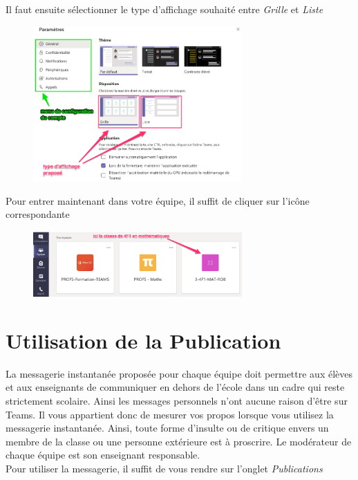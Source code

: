 Il faut ensuite sélectionner le type d'affichage souhaité entre \textit{Grille} et \textit{Liste}

\begin{figure}[h]
\includegraphics[width=8cm]{./images/teams/choix_parametre}
\centering
\end{figure}

 Pour entrer maintenant dans votre équipe, il suffit de cliquer sur l'icône correspondante

\begin{figure}[h]
\includegraphics[width=8cm]{./images/teams/entree_classe}
\centering
\end{figure}



\section{Utilisation de la Publication}

La messagerie instantanée proposée pour chaque équipe doit permettre aux élèves et aux enseignants de communiquer en dehors de l'école dans un cadre qui reste strictement scolaire. Ainsi les messages personnels n'ont aucune raison d'être sur Teams. Il vous appartient donc de mesurer vos propos lorsque vous utilisez la messagerie instantanée. Ainsi, toute forme d'insulte ou de critique envers un membre de la classe ou une personne extérieure est à proscrire. Le modérateur de chaque équipe est son enseignant responsable.\\

Pour utiliser la messagerie, il suffit de vous rendre sur l'onglet \textit{Publications}

